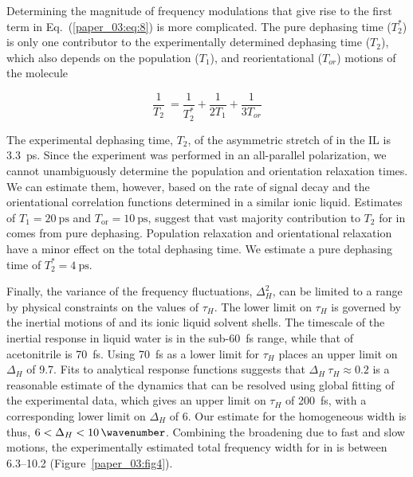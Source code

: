Determining the magnitude of frequency modulations that give rise to the first term in Eq.~(\ref{paper_03:eq:8}) is more complicated. The pure dephasing time (\(T_{2}^{*}\)) is only one contributor to the experimentally determined dephasing time (\(T_{2}\)), which also depends on the population (\(T_{1}\)), and reorientational (\(T_{or}\)) motions of the molecule

\begin{equation}
  \label{paper_03:eq:9}
  \frac{1}{T_{2}}\  = \frac{1}{T_{2}^{*}} + \frac{1}{2T_{1}} + \frac{1}{3T_{or}}
\end{equation}

The experimental dephasing time, \(T_{2}\), of the asymmetric stretch of  in the \ce{[C4C1im][PF6]} IL is \SI{3.3}{\pico\second}.\cite{Brinzer2015} Since the experiment was performed in an all-parallel polarization, we cannot unambiguously determine the population and orientation relaxation times. We can estimate them, however, based on the rate of signal decay and the orientational correlation functions determined in a similar ionic liquid.\cite{24,25} Estimates of \(T_{1} = \SI{20}{\pico\second}\) and \(T_{\mathrm{or}} = \SI{10}{\pico\second}\), suggest that vast majority contribution to \(T_{2}\) for  in \ce{[C4C1im][PF6]} comes from pure dephasing. Population relaxation and orientational relaxation have a minor effect on the total dephasing time. We estimate a pure dephasing time of \(T_{2}^{*} = \SI{4}{\pico\second}\).

Finally, the variance of the frequency fluctuations, \(\Delta_{H}^{2}\), can be limited to a range by physical constraints on the values of \(\tau_{H}\). The lower limit on \(\tau_{H}\) is governed by the inertial motions of  and its ionic liquid solvent shells. The timescale of the inertial response in liquid water is in the sub-\SI{60}{\femto\second} range, while that of acetonitrile is \SI{70}{\femto\second}.\cite{feckoSci-03,94,95} Using \SI{70}{\femto\second} as a lower limit for \(\tau_{H}\) places an upper limit on \(\Delta_{H}\) of \SI{9.7}{\wavenumber}. Fits to analytical response functions suggests that \(\Delta_{H}\ \tau_{H} \approx 0.2\) is a reasonable estimate of the dynamics that can be resolved using global fitting of the experimental data, which gives an upper limit on \(\tau_{H}\) of \SI{200}{\femto\second}, with a corresponding lower limit on \(\Delta_{H}\) of \SI{6}{\wavenumber}. Our estimate for the homogeneous width is thus, \(6 < \Delta_{H} < \SI{10}{\wavenumber}\). Combining the broadening due to fast and slow motions, the experimentally estimated total frequency width for  in \ce{[C4C1im][PF6]} is between \SIrange{6.3}{10.2}{\wavenumber} (Figure~\ref{paper_03:fig4}).

